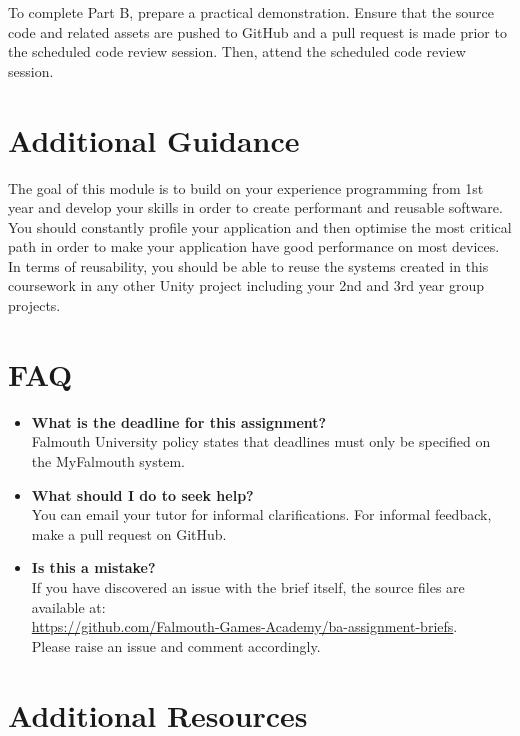 \documentclass{../../fal_assignment}
\begin{document}
To complete Part B, prepare a practical demonstration. Ensure that the source code and related assets are pushed to GitHub and a pull request is made prior to the scheduled code review session. Then, attend the scheduled code review session. 

\section*{Additional Guidance}
The goal of this module is to build on your experience programming from 1st year and develop your skills in order to create performant and reusable software. You should constantly profile your application and then optimise the most critical path in order to make your application have good performance on most devices. In terms of reusability, you should be able to reuse the systems created in this coursework in any other Unity project including your 2nd and 3rd year group projects.  

\section*{FAQ}

\begin{itemize}
	\item 	\textbf{What is the deadline for this assignment?} \\ 
    		Falmouth University policy states that deadlines must only be specified on the MyFalmouth system.
    		
	\item 	\textbf{What should I do to seek help?} \\ 
    		You can email your tutor for informal clarifications. For informal feedback, make a pull request on GitHub. 
    		
    	\item 	\textbf{Is this a mistake?} \\ 	
    		If you have discovered an issue with the brief itself, the source files are available at: \\
    		\url{https://github.com/Falmouth-Games-Academy/ba-assignment-briefs}.\\
    		 Please raise an issue and comment accordingly.
\end{itemize}

\section*{Additional Resources}
\end{document}
